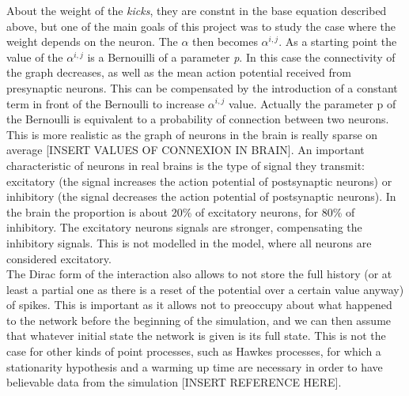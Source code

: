 \documentclass{report}
\begin{document}
	About the weight of the \emph{kicks}, they are constnt in the base equation described above, but one of the main goals of this project was to study the case where the weight depends on the neuron. The $\alpha$ then becomes $\alpha^{i,j}$. As a starting point the value of the $\alpha^{i,j}$ is a Bernouilli of a parameter \emph{p}. In this case the connectivity of the graph decreases, as well as the mean action potential received from presynaptic neurons. This can be compensated by the introduction of a constant term in front of the Bernoulli to increase $\alpha^{i,j}$ value.
	Actually the parameter p of the Bernoulli is equivalent to a probability of connection between two neurons. This is more realistic as the graph of neurons in the brain is really sparse on average [INSERT VALUES OF CONNEXION IN BRAIN]. An important characteristic of neurons in real brains is the type of signal they transmit: excitatory (the signal increases the action potential of postsynaptic neurons) or inhibitory (the signal decreases the action potential of postsynaptic neurons). In the brain the proportion is about 20\% of excitatory neurons, for 80\% of inhibitory. The excitatory neurons signals are stronger, compensating the inhibitory signals. This is not modelled in the model, where all neurons are considered excitatory.\\
	The Dirac form of the interaction also allows to not store the full history (or at least a partial one as there is a reset of the potential over a certain value anyway) of spikes. This is important as it allows not to preoccupy about what happened to the network before the beginning of the simulation, and we can then assume that whatever initial state the network is given is its full state. This is not the case for other kinds of point processes, such as Hawkes processes, for which a stationarity hypothesis and a warming up time are necessary in order to have believable data from the simulation [INSERT REFERENCE HERE].\\
\end{document}
